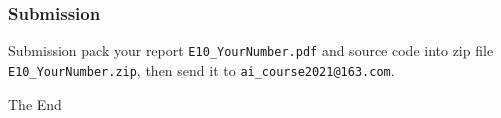 \documentclass{beamer}
\begin{document}
\begin{frame}
  \frametitle{Submission}
  \begin{block}{Submission}
    pack your report \texttt{E10\_YourNumber.pdf} and source code into zip file \texttt{E10\_YourNumber.zip}, then send it to \texttt{ai\_course2021@163.com}.
  \end{block}
\end{frame}


\begin{frame}
  \Huge{\centerline{The End}}
\end{frame}

\end{document}
